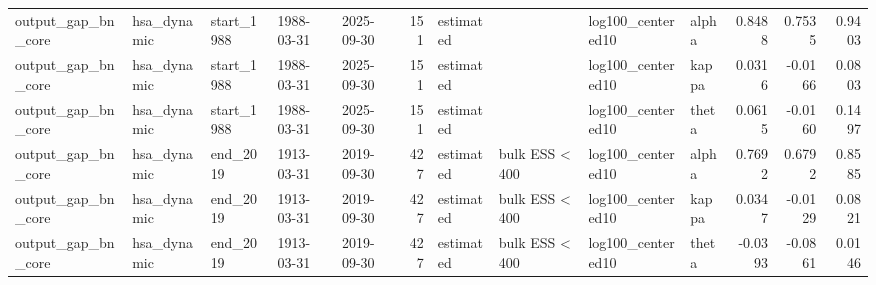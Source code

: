 \begin{tabular}{lllllrllllrrr}
output\_gap\_bn\_core & hsa\_dynamic & start\_1988 & 1988-03-31 & 2025-09-30 & 151 & estimated &  & log100\_centered10 & alpha & 0.8488 & 0.7535 & 0.9403 \\
output\_gap\_bn\_core & hsa\_dynamic & start\_1988 & 1988-03-31 & 2025-09-30 & 151 & estimated &  & log100\_centered10 & kappa & 0.0316 & -0.0166 & 0.0803 \\
output\_gap\_bn\_core & hsa\_dynamic & start\_1988 & 1988-03-31 & 2025-09-30 & 151 & estimated &  & log100\_centered10 & theta & 0.0615 & -0.0160 & 0.1497 \\
output\_gap\_bn\_core & hsa\_dynamic & end\_2019 & 1913-03-31 & 2019-09-30 & 427 & estimated & bulk ESS < 400 & log100\_centered10 & alpha & 0.7692 & 0.6792 & 0.8585 \\
output\_gap\_bn\_core & hsa\_dynamic & end\_2019 & 1913-03-31 & 2019-09-30 & 427 & estimated & bulk ESS < 400 & log100\_centered10 & kappa & 0.0347 & -0.0129 & 0.0821 \\
output\_gap\_bn\_core & hsa\_dynamic & end\_2019 & 1913-03-31 & 2019-09-30 & 427 & estimated & bulk ESS < 400 & log100\_centered10 & theta & -0.0393 & -0.0861 & 0.0146 \\
\bottomrule
\end{tabular}
